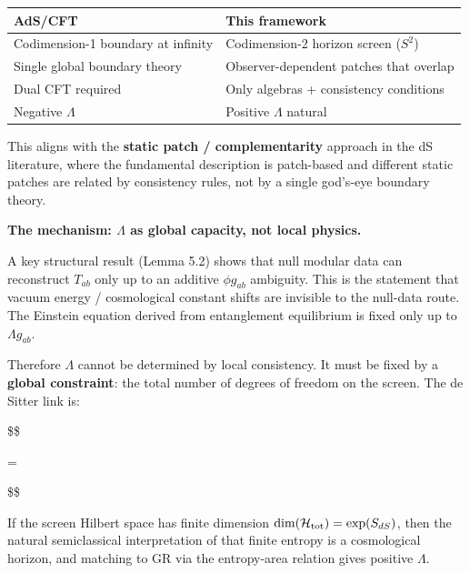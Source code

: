 \documentclass[11pt,a4paper]{article}
\theoremstyle{remark}
\begin{document}
{\def\LTcaptype{none} %
\begin{longtable}[]{@{}
  >{\raggedright\arraybackslash}p{}
  >{\raggedright\arraybackslash}p{}@{}}
\toprule\noalign{}
\begin{minipage}[b]{\linewidth}\raggedright
AdS/CFT
\end{minipage} & \begin{minipage}[b]{\linewidth}\raggedright
This framework
\end{minipage} \\
\midrule\noalign{}
\endhead
\bottomrule\noalign{}
\endlastfoot
Codimension-1 boundary at infinity & Codimension-2 horizon screen (\(S^2\)) \\
Single global boundary theory & Observer-dependent patches that overlap \\
Dual CFT required & Only algebras + consistency conditions \\
Negative \(\Lambda\) & Positive \(\Lambda\) natural \\
\end{longtable}
}

This aligns with the \textbf{static patch / complementarity} approach in the dS
literature, where the fundamental description is patch-based and different
static patches are related by consistency rules, not by a single god's-eye
boundary theory.

\textbf{The mechanism: \(\Lambda\) as global capacity, not local physics.}

A key structural result (Lemma 5.2) shows that null modular data can
reconstruct \(T_{ab}\) only up to an additive \(\phi g_{ab}\) ambiguity. This
is the statement that vacuum energy / cosmological constant shifts are
invisible to the null-data route. The Einstein equation derived from
entanglement equilibrium is fixed only up to \(\Lambda g_{ab}\).

Therefore \(\Lambda\) cannot be determined by local consistency. It must be
fixed by a \textbf{global constraint}: the total number of degrees of freedom on
the screen. The de Sitter link is:

\$\$

\Lambda = 

\$\$

If the screen Hilbert space has finite dimension \(\dim(\mathcal{H}_{\rm tot})
= \exp(S_{dS})\), then the natural semiclassical interpretation of that
finite entropy is a cosmological horizon, and matching to GR via the
entropy-area relation gives positive \(\Lambda\).
\end{document}
